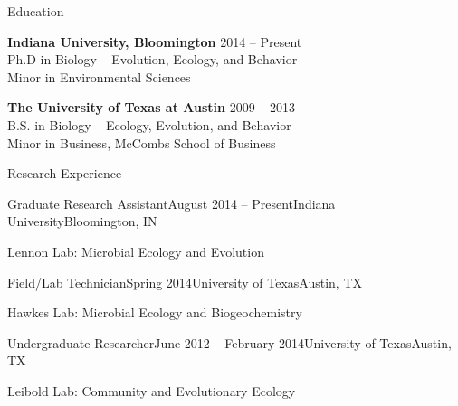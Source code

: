\documentclass{resume} %
\begin{document}

\begin{rSection}{Education}

{\bf Indiana University, Bloomington} \hfill {2014 -- Present} \\
Ph.D in Biology -- Evolution, Ecology, and Behavior \\
Minor in Environmental Sciences

{\bf The University of Texas at Austin} \hfill {2009 -- 2013} \\
B.S. in Biology -- Ecology, Evolution, and Behavior \\
Minor in Business, McCombs School of Business \\

\end{rSection}


\begin{rSection}{Research Experience}


\begin{rSubsection}{Graduate Research Assistant}{August 2014 -- Present}{Indiana University}{Bloomington, IN}
\item Lennon Lab: Microbial Ecology and Evolution
\end{rSubsection}

\begin{rSubsection}{Field/Lab Technician}{Spring 2014}{University of Texas}{Austin, TX}
\item Hawkes Lab: Microbial Ecology and Biogeochemistry
\end{rSubsection}

\begin{rSubsection}{Undergraduate Researcher}{June 2012 -- February 2014}{University of Texas}{Austin, TX}
\item Leibold Lab: Community and Evolutionary Ecology
\end{rSubsection}

\end{rSection}

\end{document}
